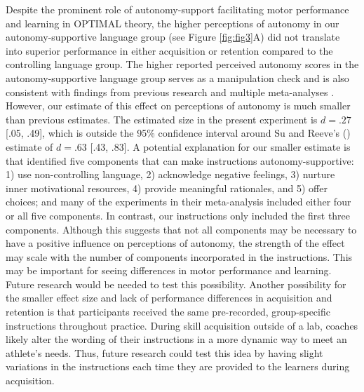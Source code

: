 \documentclass[man,floatsintext,donotrepeattitle,letterpaper,12pt]{apa7}
\begin{document}
Despite the prominent role of autonomy-support facilitating motor performance and learning in OPTIMAL theory, the higher perceptions of autonomy in our autonomy-supportive language group (see Figure \ref{fig:fig3}A) did not translate into superior performance in either acquisition or retention compared to the controlling language group. The higher reported perceived autonomy scores in the autonomy-supportive language group serves as a manipulation check and is also consistent with findings from previous research \autocite[e.g.,][]{reeve2011} and multiple meta-analyses \autocite[e.g.,][]{mossman2022,ng2012,okada2021,su2011}. However, our estimate of this effect on perceptions of autonomy is much smaller than previous estimates. The estimated size in the present experiment is $d = .27$ [.05, .49], which is outside the 95\% confidence interval around Su and Reeve's (\citeyear{su2011}) estimate of $d = .63$ [.43, .83]. A potential explanation for our smaller estimate is that \textcite{su2011} identified five components that can make instructions autonomy-supportive: 1) use non-controlling language, 2) acknowledge negative feelings, 3) nurture inner motivational resources, 4) provide meaningful rationales, and 5) offer choices; and many of the experiments in their meta-analysis included either four or all five components. In contrast, our instructions only included the first three components. Although this suggests that not all components may be necessary to have a positive influence on perceptions of autonomy, the strength of the effect may scale with the number of components incorporated in the instructions. This may be important for seeing differences in motor performance and learning. Future research would be needed to test this possibility. Another possibility for the smaller effect size and lack of performance differences in acquisition and retention is that participants received the same pre-recorded, group-specific instructions throughout practice. During skill acquisition outside of a lab, coaches likely alter the wording of their instructions in a more dynamic way to meet an athlete's needs. Thus, future research could test this idea by having slight variations in the instructions each time they are provided to the learners during acquisition.
\end{document}
